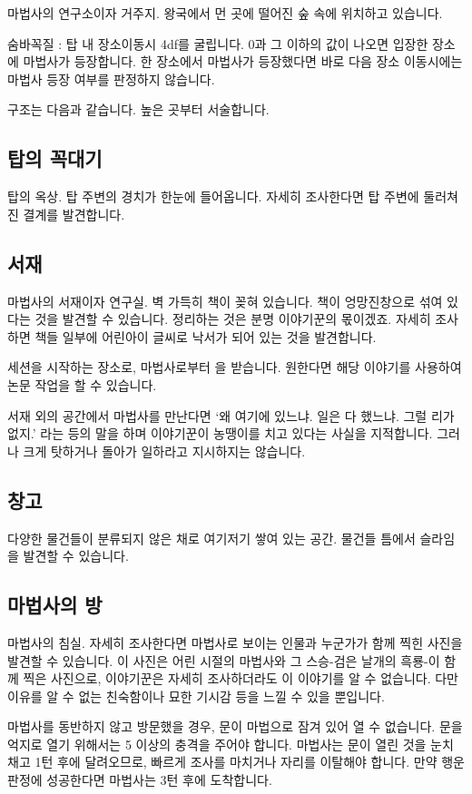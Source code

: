 \documentclass{report}
\begin{document}
	마법사의 연구소이자 거주지. 왕국에서 먼 곳에 떨어진 숲 속에 위치하고 있습니다.
	
	숨바꼭질 : 탑 내 장소이동시 4df를 굴립니다. 0과 그 이하의 값이 나오면 입장한 장소에 마법사가 등장합니다. 한 장소에서 마법사가 등장했다면 바로 다음 장소 이동시에는 마법사 등장 여부를 판정하지 않습니다.
	
	구조는 다음과 같습니다. 높은 곳부터 서술합니다.

	\subsection*{탑의 꼭대기}
		탑의 옥상. 탑 주변의 경치가 한눈에 들어옵니다. 자세히 조사한다면 탑 주변에 둘러쳐진 결계를 발견합니다.
	
	\subsection*{서재}
		마법사의 서재이자 연구실. 벽 가득히 책이 꽂혀 있습니다. 책이 엉망진창으로 섞여 있다는 것을 발견할 수 있습니다. 정리하는 것은 분명 이야기꾼의 몫이겠죠. 자세히 조사하면 책들 일부에 어린아이 글씨로 낙서가 되어 있는 것을 발견합니다.
		
		세션을 시작하는 장소로, 마법사로부터 을 받습니다. 원한다면 해당 이야기를 사용하여 논문 작업을 할 수 있습니다.
		
		서재 외의 공간에서 마법사를 만난다면 `왜 여기에 있느냐. 일은 다 했느냐. 그럴 리가 없지.' 라는 등의 말을 하며 이야기꾼이 농땡이를 치고 있다는 사실을 지적합니다. 그러나 크게 탓하거나 돌아가 일하라고 지시하지는 않습니다.
	
	\subsection*{창고}
		다양한 물건들이 분류되지 않은 채로 여기저기 쌓여 있는 공간. 물건들 틈에서 슬라임을 발견할 수 있습니다.
	
	\subsection*{마법사의 방}
		마법사의 침실. 자세히 조사한다면 마법사로 보이는 인물과 누군가가 함께 찍힌 사진을 발견할 수 있습니다. 이 사진은 어린 시절의 마법사와 그 스승-검은 날개의 흑룡-이 함께 찍은 사진으로, 이야기꾼은 자세히 조사하더라도 이 이야기를 알 수 없습니다. 다만 이유를 알 수 없는 친숙함이나 묘한 기시감 등을 느낄 수 있을 뿐입니다.
		
		마법사를 동반하지 않고 방문했을 경우, 문이 마법으로 잠겨 있어 열 수 없습니다. 문을 억지로 열기 위해서는 5 이상의 충격을 주어야 합니다. 마법사는 문이 열린 것을 눈치 채고 1턴 후에 달려오므로, 빠르게 조사를 마치거나 자리를 이탈해야 합니다. 만약 행운 판정에 성공한다면 마법사는 3턴 후에 도착합니다.
		
\end{document}
